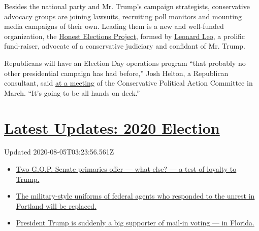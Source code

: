 Besides the national party and Mr. Trump's campaign strategists,
conservative advocacy groups are joining lawsuits, recruiting poll
monitors and mounting media campaigns of their own. Leading them is a
new and well-funded organization, the
\href{https://www.honestelections.org/}{Honest Elections Project},
formed by
\href{https://www.washingtonpost.com/graphics/2019/investigations/leonard-leo-federalists-society-courts/}{Leonard
Leo}, a prolific fund-raiser, advocate of a conservative judiciary and
confidant of Mr. Trump.

Republicans will have an Election Day operations program ``that probably
no other presidential campaign has had before,'' Josh Helton, a
Republican consultant, said
\href{https://cpac.conservative.org/protecting-the-ballot-box-defeating-the-lefts-voter-fraud-machine/}{at
a meeting} of the Conservative Political Action Committee in March.
``It's going to be all hands on deck.''

\hypertarget{latest-updates-2020-election}{%
\section{\texorpdfstring{\href{https://www.nytimes3xbfgragh.onion/2020/08/04/us/elections/primary-election-michigan-arizona-kansas.html?action=click\&pgtype=Article\&state=default\&region=MAIN_CONTENT_1\&context=storylines_live_updates}{Latest
Updates: 2020
Election}}{Latest Updates: 2020 Election}}\label{latest-updates-2020-election}}

Updated 2020-08-05T03:23:56.561Z

\begin{itemize}
\tightlist
\item
  \href{https://www.nytimes3xbfgragh.onion/2020/08/04/us/elections/primary-election-michigan-arizona-kansas.html?action=click\&pgtype=Article\&state=default\&region=MAIN_CONTENT_1\&context=storylines_live_updates\#link-3924dd44}{Two
  G.O.P. Senate primaries offer --- what else? --- a test of loyalty to
  Trump.}
\item
  \href{https://www.nytimes3xbfgragh.onion/2020/08/04/us/elections/primary-election-michigan-arizona-kansas.html?action=click\&pgtype=Article\&state=default\&region=MAIN_CONTENT_1\&context=storylines_live_updates\#link-62a8e06b}{The
  military-style uniforms of federal agents who responded to the unrest
  in Portland will be replaced.}
\item
  \href{https://www.nytimes3xbfgragh.onion/2020/08/04/us/elections/primary-election-michigan-arizona-kansas.html?action=click\&pgtype=Article\&state=default\&region=MAIN_CONTENT_1\&context=storylines_live_updates\#link-32b39e33}{President
  Trump is suddenly a big supporter of mail-in voting --- in Florida.}
\end{itemize}

